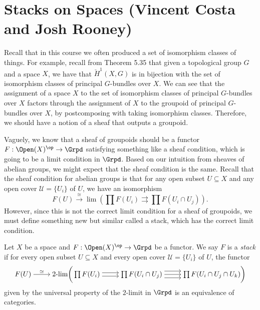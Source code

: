 \section{Stacks on Spaces (Vincent Costa and Josh Rooney)}

Recall that in this course we often produced a set of isomorphism classes of things. For example, recall from Theorem 5.35 that given a topological group $G$ and a space $X$, we have that $\check{H}^1(X, G)$ is in bijection with the set of isomorphism classes of principal $G$-bundles over $X$. We can see that the assignment of a space $X$ to the set of isomorphism classes of principal $G$-bundles over $X$ factors through the assignment of $X$ to the groupoid of principal $G$-bundles over $X$, by postcomposing with taking isomorphism classes. Therefore, we should have a notion of a sheaf that outputs a groupoid. 

Vaguely, we know that a sheaf of groupoids should be a functor $F: \Open(X)^\op \to \Grpd$ satisfying something like a sheaf condition, which is going to be a limit condition in $\Grpd$. Based on our intuition from sheaves of abelian groups, we might expect that the sheaf condition is the same. Recall that the sheaf condition for abelian groups is that for any open subset $U \subseteq X$ and any open cover $\mathcal{U} = \{ U_i \}$ of $U$, we have an isomorphism
$$
F(U) \xrightarrow[]{\cong} \lim \left( \prod F(U_i) \rightrightarrows \prod F(U_i \cap U_j) \right).
$$
However, since this is not the correct limit condition for a sheaf of groupoids, we must define something new but similar called a stack, which has the correct limit condition.

\begin{definition}[Stack]
    Let $X$ be a space and $F: \Open(X)^{\op} \to \Grpd$ be a functor. We say $F$ is a \textit{stack} if for every open subset $U \subseteq X$ and every open cover $\mathcal{U} = \{U_i\}$ of $U$, the functor
    \[\begin{tikzcd}[cramped]
    	{F(U)} & {2\text{-lim} \bigg( \prod F(U_i)} & {\prod F(U_i \cap U_j)} & {\prod F(U_i \cap U_j \cap U_k) \bigg)}
    	\arrow["\simeq", from=1-1, to=1-2]
    	\arrow[shift right, from=1-2, to=1-3]
    	\arrow[shift left, from=1-2, to=1-3]
    	\arrow[from=1-3, to=1-4]
    	\arrow[shift left=2, from=1-3, to=1-4]
    	\arrow[shift right=2, from=1-3, to=1-4]
    \end{tikzcd}\]
    given by the universal property of the $2$-limit in $\Grpd$ is an equivalence of categories.
\end{definition}

